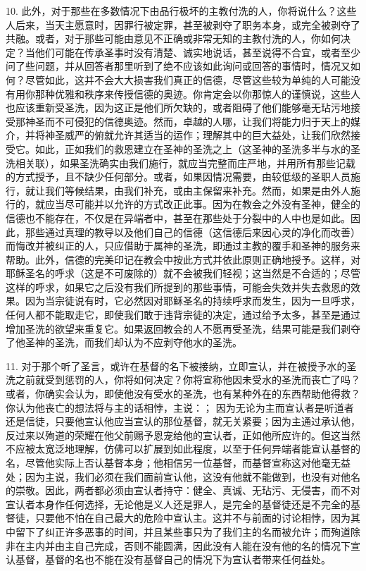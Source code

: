 10. 此外，对于那些在多数情况下由品行极坏的主教付洗的人，你将说什么？这些人后来，当天主愿意时，因罪行被定罪，甚至被剥夺了职务本身，或完全被剥夺了共融。或者，对于那些可能由意见不正确或非常无知的主教付洗的人，你如何决定？当他们可能在传承圣事时没有清楚、诚实地说话，甚至说得不合宜，或者至少问了些问题，并从回答者那里听到了绝不应该如此询问或回答的事情时，情况又如何？尽管如此，这并不会大大损害我们真正的信德，尽管这些较为单纯的人可能没有用你那种优雅和秩序来传授信德的奥迹。你肯定会以你那惊人的谨慎说，这些人也应该重新受圣洗，因为这正是他们所欠缺的，或者阻碍了他们能够毫无玷污地接受那神圣而不可侵犯的信德奥迹。然而，卓越的人哪，让我们将能力归于天上的媒介，并将神圣威严的俯就允许其适当的运作；理解其中的巨大益处，让我们欣然接受它。如此，正如我们的救恩建立在圣神的圣洗之上（这圣神的圣洗多半与水的圣洗相关联），如果圣洗确实由我们施行，就应当完整而庄严地，并用所有那些记载的方式授予，且不缺少任何部分。或者，如果因情况需要，由较低级的圣职人员施行，就让我们等候结果，由我们补充，或由主保留来补充。然而，如果是由外人施行的，就应当尽可能并以允许的方式改正此事。因为在教会之外没有圣神，健全的信德也不能存在，不仅是在异端者中，甚至在那些处于分裂中的人中也是如此。因此，那些通过真理的教导以及他们自己的信德（这信德后来因心灵的净化而改善）而悔改并被纠正的人，只应借助于属神的圣洗，即通过主教的覆手和圣神的服务来帮助。此外，信德的完美印记在教会中按此方式并依此原则正确地授予。这样，对耶稣圣名的呼求（这是不可废除的）就不会被我们轻视；这当然是不合适的；尽管这样的呼求，如果它之后没有我们所提到的那些事情，可能会失效并失去救恩的效果。因为当宗徒说有时，它必然因对耶稣圣名的持续呼求而发生，因为一旦呼求，任何人都不能取走它，即使我们敢于违背宗徒的决定，通过给予太多，甚至是通过增加圣洗的欲望来重复它。如果返回教会的人不愿再受圣洗，结果可能是我们剥夺了他圣神的圣洗，而我们却认为不应剥夺他水的圣洗。\par

11. 对于那个听了圣言，或许在基督的名下被接纳，立即宣认，并在被授予水的圣洗之前就受到惩罚的人，你将如何决定？你将宣称他因未受水的圣洗而丧亡了吗？或者，你确实会认为，即使他没有受水的圣洗，也有某种外在的东西帮助他得救？你认为他丧亡的想法将与主的话相悖，主说：； 因为无论为主而宣认者是听道者还是信徒，只要他宣认他应当宣认的那位基督，就无关紧要；因为主通过承认他，反过来以殉道的荣耀在他父前赐予恩宠给他的宣认者，正如他所应许的。但这当然不应被太宽泛地理解，仿佛可以扩展到如此程度，以至于任何异端者能宣认基督的名，尽管他实际上否认基督本身；他相信另一位基督，而基督宣称这对他毫无益处；因为主说，我们必须在我们面前宣认他，这没有他就不能做到，也没有对他名的崇敬。因此，两者都必须由宣认者持守：健全、真诚、无玷污、无侵害，而不对宣认者本身作任何选择，无论他是义人还是罪人，是完全的基督徒还是不完全的基督徒，只要他不怕在自己最大的危险中宣认主。这并不与前面的讨论相悖，因为其中留下了纠正许多恶事的时间，并且某些事只为了我们主的名而被允许；而殉道除非在主内并由主自己完成，否则不能圆满，因此没有人能在没有他的名的情况下宣认基督，基督的名也不能在没有基督自己的情况下为宣认者带来任何益处。\par

